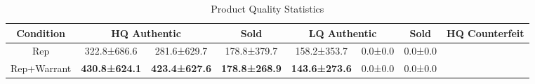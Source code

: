 \begin{table}[t]
    \centering
    \caption{Product Quality Statistics}
    \label{tab:rq1_product_quality}
    \begin{tabular}{ccccccc}
    \toprule
    \textbf{Condition} & \multicolumn{2}{c}{HQ Authentic} & \textbf{Sold} & \multicolumn{2}{c}{LQ Authentic} & \textbf{Sold} & \multicolumn{2}{c}{HQ Counterfeit} \\
    \midrule
    Rep & 322.8±686.6 & 281.6±629.7 & 178.8±379.7 & 158.2±353.7 & 0.0±0.0 & 0.0±0.0 \\
    Rep+Warrant & \textbf{430.8±624.1} & \textbf{423.4±627.6} & \textbf{178.8±268.9} & \textbf{143.6±273.6} & 0.0±0.0 & 0.0±0.0 \\
    \bottomrule
    \end{tabular}
\end{table}